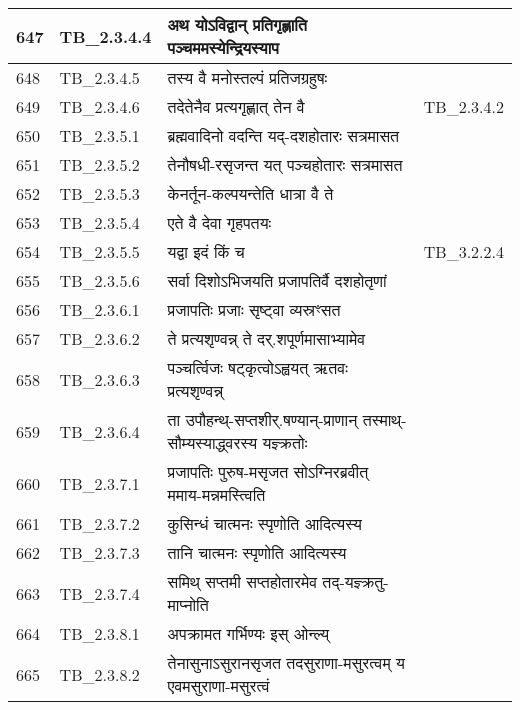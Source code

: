 \documentclass[17pt]{extarticle}
\begin{document}
\begin{longtable}{||p{0.4in}||p{0.9in}||p{4.0in}||p{0.9in}||}
            647 & TB\_2.3.4.4 & अथ योऽविद्वान् प्रतिगृह्णाति पञ्चममस्येन्द्रियस्याप &      \\
        \hline
            648 & TB\_2.3.4.5 & तस्य वै मनोस्तल्पं प्रतिजग्रहुषः &      \\
        \hline
            649 & TB\_2.3.4.6 & तदेतेनैव प्रत्यगृह्णात् तेन वै & TB\_2.3.4.2        \\
        \hline
            650 & TB\_2.3.5.1 & ब्रह्मवादिनो वदन्ति यद्{-}दशहोतारः सत्रमासत &      \\
        \hline
            651 & TB\_2.3.5.2 & तेनौषधी{-}रसृजन्त यत् पञ्चहोतारः सत्रमासत &      \\
        \hline
            652 & TB\_2.3.5.3 & केनर्तून{-}कल्पयन्तेति धात्रा वै ते &      \\
        \hline
            653 & TB\_2.3.5.4 & एते वै देवा गृहपतयः &      \\
        \hline
            654 & TB\_2.3.5.5 & यद्वा इदं किं च &  TB\_3.2.2.4       \\
        \hline
            655 & TB\_2.3.5.6 & सर्वा दिशोऽभिजयति प्रजापतिर्वै दशहोतृणां &      \\
        \hline
            656 & TB\_2.3.6.1 & प्रजापतिः प्रजाः सृष्ट्वा व्यस्रꣳसत &      \\
        \hline
            657 & TB\_2.3.6.2 & ते प्रत्यशृण्वन्न् ते दर्.शपूर्णमासाभ्यामेव &      \\
        \hline
            658 & TB\_2.3.6.3 & पञ्चर्त्विजः षट्कृत्वोऽह्वयत् ऋतवः प्रत्यशृण्वन्न् &      \\
        \hline
            659 & TB\_2.3.6.4 & ता उपौहन्थ्{-}सप्तशीर्.षण्यान्{-}प्राणान् तस्माथ्{-}सौम्यस्याद्ध्वरस्य यज्ञ्क्रतोः &      \\
        \hline
            660 & TB\_2.3.7.1 & प्रजापतिः पुरुष{-}मसृजत सोऽग्निरब्रवीत् ममाय{-}मन्नमस्त्विति &      \\
        \hline
            661 & TB\_2.3.7.2 & कुसिन्धं चात्मनः स्पृणोति आदित्यस्य &      \\
        \hline
            662 & TB\_2.3.7.3 & तानि चात्मनः स्पृणोति आदित्यस्य &      \\
        \hline
            663 & TB\_2.3.7.4 & समिथ् सप्तमी सप्तहोतारमेव तद्{-}यज्ञ्क्रतु{-}माप्नोति &      \\
        \hline
            664 & TB\_2.3.8.1 & अपक्रामत गर्भिण्यः इस् ओन्ल्य् &      \\
        \hline
            665 & TB\_2.3.8.2 & तेनासुनाऽसुरानसृजत तदसुराणा{-}मसुरत्वम् य एवमसुराणा{-}मसुरत्वं &      \\

\end{longtable}
\end{document}
